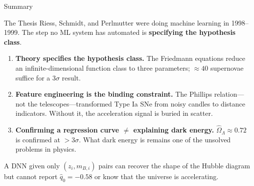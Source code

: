 \documentclass[aspectratio=169]{beamer}
\begin{document}
\begin{frame}{Summary}

\begin{block}{The Thesis}
Riess, Schmidt, and Perlmutter were doing machine learning in 1998--1999.
The step no ML system has automated is \textbf{specifying the hypothesis
class}.
\end{block}

\bigskip
\begin{enumerate}
  \item \textbf{Theory specifies the hypothesis class.}
    The Friedmann equations reduce an infinite-dimensional function class
    to three parameters; $\approx 40$ supernovae suffice for a
    $3\sigma$ result.
  \item \textbf{Feature engineering is the binding constraint.}
    The Phillips relation---not the telescopes---transformed Type Ia SNe
    from noisy candles to distance indicators.  Without it, the
    acceleration signal is buried in scatter.
  \item \textbf{Confirming a regression curve $\neq$ explaining dark
    energy.}
    $\hat\Omega_\Lambda \approx 0.72$ is confirmed at $>3\sigma$.
    What dark energy is remains one of the unsolved problems in physics.
\end{enumerate}

\bigskip
A DNN given only $(z_i, m_{B,i})$ pairs can recover the shape of the
Hubble diagram but cannot report $\hat q_0 = -0.58$ or know that the
universe is accelerating.

\end{frame}
\end{document}
